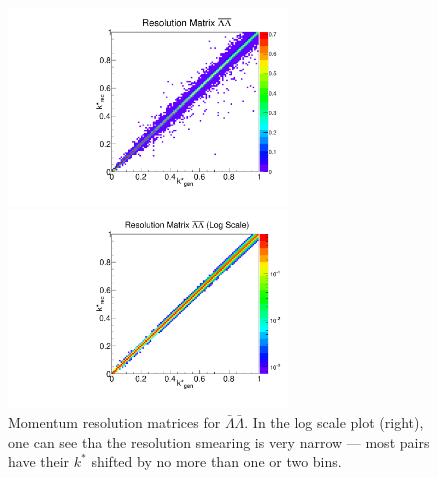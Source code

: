\begin{figure}[ht]
\begin{minipage}{17.5pc}
\includegraphics[width=17.5pc]{Figures/2016-07-19-ResMatrixAntiLambdaAntiLambda.pdf}
\end{minipage}\hspace{0.5pc}
\begin{minipage}{17.5pc}
\includegraphics[width=17.5pc]{Figures/2016-07-19-ResMatrixAntiLambdaAntiLambdaLog.pdf}
\end{minipage} 
\caption[Momentum resolution matrices -- $\bar{\Lambda}\bar{\Lambda}$]{\label{fig:MomResAA} Momentum resolution matrices for $\bar{\Lambda}\bar{\Lambda}$. In the log scale plot (right), one can see tha the resolution smearing is very narrow --- most pairs have their $k^*$ shifted by no more than one or two bins.}
\end{figure}


